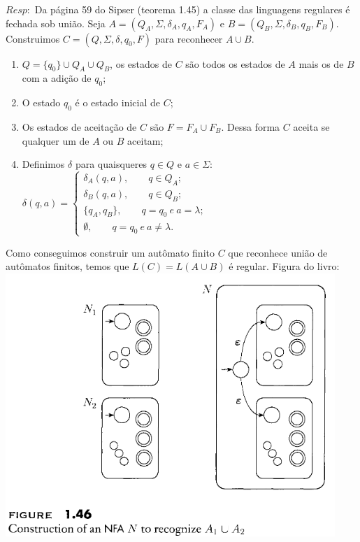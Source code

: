 \documentclass{homework}
\begin{document}
	$Resp:$ Da página 59 do Sipser (teorema 1.45) a classe das linguagens regulares é fechada sob união.
	Seja $A =(Q_A,\Sigma,\delta_A,q_A,F_A)$ e $B = (Q_B,\Sigma,\delta_B,q_B,F_B)$.\\
	Construimos $C = (Q,\Sigma,\delta,q_0,F)$ para reconhecer $A \cup B$.
	\begin{enumerate}
		\item $Q = \{q_0\} \cup Q_A \cup Q_B$, os estados de $C$ são todos os estados de $A$ mais os de $B$ com a adição de $q_0$;
		\item O estado $q_0$ é o estado inicial de $C$;
		\item Os estados de aceitação de $C$ são $F = F_A \cup F_B$. Dessa forma $C$ aceita se qualquer um de $A$ ou $B$ aceitam;
		\item Definimos $\delta$ para quaisqueres $q \in Q$ e $a \in \Sigma$:\\
		$\delta(q,a) = \begin{cases}
							\delta_A(q,a),\qquad q \in Q_A;\\
							\delta_B(q,a),\qquad q \in Q_B;\\
							\{q_A,q_B\},\qquad q = q_0 \ e \ a = \lambda;\\
							\emptyset, \qquad  q = q_0 \ e \ a \neq \lambda.
					   \end{cases}					  
		$
	\end{enumerate}
	Como conseguimos construir um autômato finito $C$ que reconhece união de autômatos finitos, temos que $L(C) = L(A \cup B)$ é regular.
	Figura do livro:\\
	\includegraphics[scale=.5]{Q4-SipserAutom}
\end{document}
